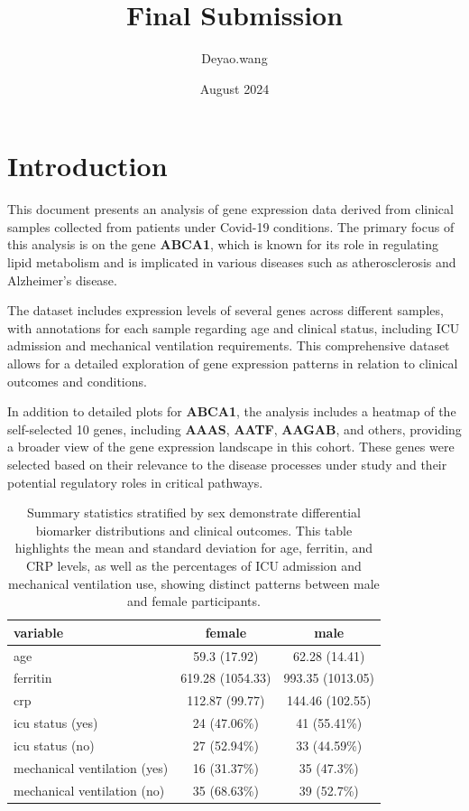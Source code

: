 \documentclass{article}
\title{Final Submission}
\author{Deyao.wang}
\date{August 2024}
\begin{document}
\maketitle

\section{Introduction}
This document presents an analysis of gene expression data derived from clinical samples collected from patients under Covid-19 conditions. The primary focus of this analysis is on the gene \textbf{ABCA1}, which is known for its role in regulating lipid metabolism and is implicated in various diseases such as atherosclerosis and Alzheimer's disease.

The dataset includes expression levels of several genes across different samples, with annotations for each sample regarding age and clinical status, including ICU admission and mechanical ventilation requirements. This comprehensive dataset allows for a detailed exploration of gene expression patterns in relation to clinical outcomes and conditions.

In addition to detailed plots for \textbf{ABCA1}, the analysis includes a heatmap of the self-selected 10 genes, including \textbf{AAAS}, \textbf{AATF}, \textbf{AAGAB}, and others, providing a broader view of the gene expression landscape in this cohort. These genes were selected based on their relevance to the disease processes under study and their potential regulatory roles in critical pathways.

\begin{table}[H]
\centering
\centering
\caption{Summary statistics stratified by sex demonstrate differential biomarker distributions and clinical outcomes. This table highlights the mean and standard deviation for age, ferritin, and CRP levels, as well as the percentages of ICU admission and mechanical ventilation use, showing distinct patterns between male and female participants.}
\begin{tabular}[t]{lcc}
\toprule
\textbf{variable} & \textbf{ female} & \textbf{ male}\\
\midrule
age & 59.3 (17.92) & 62.28 (14.41)\\
ferritin & 619.28 (1054.33) & 993.35 (1013.05)\\
crp & 112.87 (99.77) & 144.46 (102.55)\\
icu status (yes) & 24 (47.06\%) & 41 (55.41\%)\\
icu status (no) & 27 (52.94\%) & 33 (44.59\%)\\
\addlinespace
mechanical ventilation (yes) & 16 (31.37\%) & 35 (47.3\%)\\
mechanical ventilation (no) & 35 (68.63\%) & 39 (52.7\%)\\
\bottomrule
\end{tabular}
\end{table}
\end{document}
